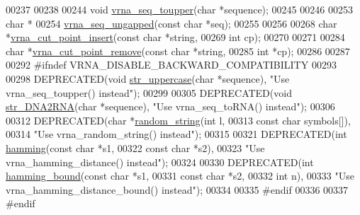 \begin{DoxyCode}
00237 
00238 
00244 \textcolor{keywordtype}{void} \hyperlink{group__string__utils_ga4f44dca03c9d708d68e64c0610bb9091}{vrna\_seq\_toupper}(\textcolor{keywordtype}{char} *sequence);
00245 
00246 
00253 \textcolor{keywordtype}{char} *
00254 \hyperlink{group__string__utils_ga0d031df5266328fe455e244e094634fd}{vrna\_seq\_ungapped}(\textcolor{keyword}{const} \textcolor{keywordtype}{char} *seq);
00255 
00256 
00268 \textcolor{keywordtype}{char} *\hyperlink{group__string__utils_ga74f05ece32ea73b59f84a7452afd5fae}{vrna\_cut\_point\_insert}(\textcolor{keyword}{const} \textcolor{keywordtype}{char}  *\textcolor{keywordtype}{string},
00269                             \textcolor{keywordtype}{int}         cp);
00270 
00271 
00284 \textcolor{keywordtype}{char} *\hyperlink{group__string__utils_ga1fbd821d4408cc5f1dd9d12c15e092cb}{vrna\_cut\_point\_remove}(\textcolor{keyword}{const} \textcolor{keywordtype}{char}  *\textcolor{keywordtype}{string},
00285                             \textcolor{keywordtype}{int}         *cp);
00286 
00287 
00292 \textcolor{preprocessor}{#ifndef VRNA\_DISABLE\_BACKWARD\_COMPATIBILITY}
00293 
00298 DEPRECATED(\textcolor{keywordtype}{void}  \hyperlink{strings_8h_a17b796b806f96b70382077fb5bc519bb}{str\_uppercase}(\textcolor{keywordtype}{char} *sequence), \textcolor{stringliteral}{"Use vrna\_seq\_toupper() instead"});
00299 
00305 DEPRECATED(\textcolor{keywordtype}{void} \hyperlink{strings_8h_ad3f18dd83f958f18b2f26ecb99305208}{str\_DNA2RNA}(\textcolor{keywordtype}{char} *sequence), \textcolor{stringliteral}{"Use vrna\_seq\_toRNA() instead"});
00306 
00312 DEPRECATED(\textcolor{keywordtype}{char} *\hyperlink{strings_8h_a1b95eac365a021572e1c37e5993a89be}{random\_string}(\textcolor{keywordtype}{int}        l,
00313                                \textcolor{keyword}{const} \textcolor{keywordtype}{char} symbols[]),
00314 \textcolor{stringliteral}{"Use vrna\_random\_string() instead"});
00315 
00321 DEPRECATED(\textcolor{keywordtype}{int} \hyperlink{strings_8h_ad9dc7bfc9aa664dc6698f17ce07fc7e7}{hamming}(\textcolor{keyword}{const} \textcolor{keywordtype}{char} *s1,
00322                        \textcolor{keyword}{const} \textcolor{keywordtype}{char} *s2),
00323 \textcolor{stringliteral}{"Use vrna\_hamming\_distance() instead"});
00324 
00330 DEPRECATED(\textcolor{keywordtype}{int} \hyperlink{strings_8h_a96d3c36717d624514055ce201cab1542}{hamming\_bound}(\textcolor{keyword}{const} \textcolor{keywordtype}{char} *s1,
00331                              \textcolor{keyword}{const} \textcolor{keywordtype}{char} *s2,
00332                              \textcolor{keywordtype}{int}        n),
00333 \textcolor{stringliteral}{"Use vrna\_hamming\_distance\_bound() instead"});
00334 
00335 \textcolor{preprocessor}{#endif}
00336 
00337 \textcolor{preprocessor}{#endif}
\end{DoxyCode}
